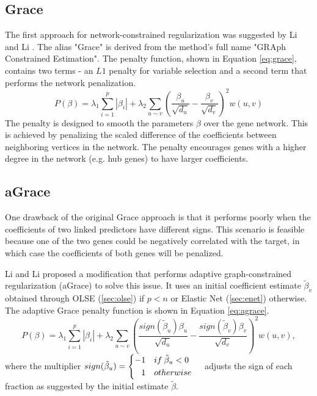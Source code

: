 \subsection{Grace} \label{sec:grace}
The first approach for network-constrained regularization was suggested by Li and Li \cite{li2008network}. The alias "Grace" is derived from the method's full name "GRAph Constrained Estimation". The penalty function, shown in Equation \ref{eq:grace}, contains two terms - an $L1$ penalty for variable selection and a second term that performs the network penalization.  
\begin{equation} \label{eq:grace}
P(\beta) = \lambda_1\sum_{i=1}^{p}\left|\beta_i\right| + \lambda_2\sum_{u \sim v}\left(\frac{\beta_u}{\sqrt{d_u}}-\frac{\beta_v}{\sqrt{d_v}}\right)^2w(u,v)
\end{equation}
The penalty is designed to smooth the parameters $\beta$ over the gene network. This is achieved by penalizing the scaled difference of the coefficients between neighboring vertices in the network. The penalty encourages genes with a higher degree in the network (e.g. hub genes) to have larger coefficients.


\subsection{aGrace} \label{sec:agrace}
One drawback of the original Grace approach is that it performs poorly when the coefficients of two linked predictors have different signs. This scenario is feasible because one of the two genes could be negatively correlated with the target, in which case the coefficients of both genes will be penalized.  

Li and Li proposed a modification \cite{li2010variable} that performs adaptive graph-constrained regularization (aGrace) to solve this issue. It uses an initial coefficient estimate $\tilde{\beta}_v$ obtained through OLSE (\ref{sec:olse}) if $p<n$ or Elastic Net (\ref{sec:enet}) otherwise. The adaptive Grace penalty function is shown in Equation \ref{eq:agrace}.
\begin{equation} \label{eq:agrace}
P(\beta) = \lambda_1\sum_{i=1}^{p}\left|\beta_i\right| + \lambda_2\sum_{u \sim v}\left(\frac{sign(\tilde{\beta}_u)\beta_u}{\sqrt{d_u}}-\frac{sign(\tilde{\beta}_v)\beta_v}{\sqrt{d_v}}\right)^2w(u,v),
\end{equation}
where the multiplier $sign(\tilde{\beta}_u) = \left\{ \begin{aligned} -1 &\quad if \: \tilde{\beta}_u < 0 \cr 1 &\quad otherwise \end{aligned} \right.$ adjusts the sign of each fraction as suggested by the initial estimate $\tilde{\beta}$.


